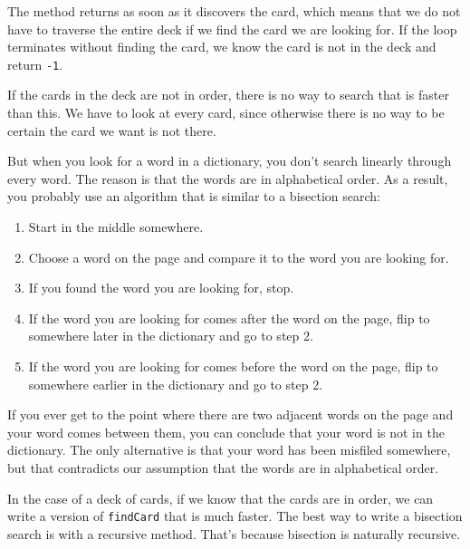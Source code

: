 \documentclass{book}
\begin{document}

The method returns as soon as it discovers
the card, which means that we do not have to traverse the entire
deck if we find the card we are looking for.  If the loop terminates
without finding the card, we know the card is not in the deck
and return {\tt -1}.

If the cards in the deck are not in order, there is no way to search
that is faster than this.  We have to look at every card, since
otherwise there is no way to be certain the card we want is not
there.


But when you look for a word in a dictionary, you don't search
linearly through every word.  The reason is that the words are in
alphabetical order.  As a result, you probably use an algorithm that
is similar to a bisection search:

\begin {enumerate}

\item Start in the middle somewhere.

\item Choose a word on the page and compare it to the word you
are looking for.

\item If you found the word you are looking for, stop.

\item If the word you are looking for comes after the word on
the page, flip to somewhere later in the dictionary and go to
step 2.

\item If the word you are looking for comes before the word on
the page, flip to somewhere earlier in the dictionary and go to
step 2.

\end {enumerate}

If you ever get to the point where there are two adjacent words on the
page and your word comes between them, you can conclude that your word
is not in the dictionary.  The only alternative is that your word has
been misfiled somewhere, but that contradicts our assumption that the
words are in alphabetical order.

In the case of a deck of cards, if we know that the cards are in
order, we can write a version of {\tt findCard} that is much faster.
The best way to write a bisection search is with a recursive method.
That's because bisection is naturally recursive.
\end{document}
